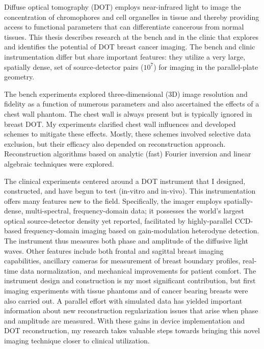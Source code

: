 Diffuse optical tomography (DOT) employs near-infrared light to image the concentration of chromophores and cell organelles in tissue and thereby providing access to functional parameters that can differentiate cancerous from normal tissues. This thesis describes research at the bench and in the clinic that explores and identifies the potential of DOT breast cancer imaging. The bench and clinic instrumentation differ but share important features: they utilize a very large, spatially dense, set of source-detector pairs ($10^7$) for imaging in the parallel-plate geometry. 

The bench experiments explored three-dimensional (3D) image resolution and fidelity as a function of numerous parameters and also ascertained the effects of a chest wall phantom. The chest wall is always present but is typically ignored in breast DOT. My experiments clarified chest wall influences and developed schemes to mitigate these effects. Mostly, these schemes involved selective data exclusion, but their efficacy also depended on reconstruction approach. Reconstruction algorithms based on analytic (fast) Fourier inversion and linear algebraic techniques were explored. 

The clinical experiments centered around a DOT instrument that I designed, constructed, and have begun to test (in-vitro and in-vivo). This instrumentation offers many features new to the field. Specifically, the imager employs spatially-dense, multi-spectral, frequency-domain data; it possesses the world's largest optical source-detector density yet reported, facilitated by highly-parallel CCD-based frequency-domain imaging based on gain-modulation heterodyne detection. The instrument thus measures both phase and amplitude of the diffusive light waves. Other features include both frontal and sagittal breast imaging capabilities, ancillary cameras for measurement of breast boundary profiles, real-time data normalization, and mechanical improvements for patient comfort. The instrument design and construction is my most significant contribution, but first imaging experiments with tissue phantoms and of cancer bearing breasts were also carried out. A parallel effort with simulated data has yielded important information about new reconstruction regularization issues that arise when phase and amplitude are measured. With these gains in device implementation and DOT reconstruction, my research takes valuable steps towards bringing this novel imaging technique closer to clinical utilization.
